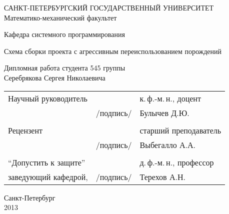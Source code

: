 %
%
\thispagestyle{empty}
\begin{center}
САНКТ-ПЕТЕРБУРГСКИЙ ГОСУДАРСТВЕННЫЙ УНИВЕРСИТЕТ\\
Математико-механический факультет\\
\end{center}

\begin{center}
Кафедра системного программирования\\
\end{center}
\vspace{2cm}
\begin{center}
    \LARGE{Схема сборки проекта с агрессивным переиспользованием порождений} \\
\end{center}
\vspace{1cm}
\begin{center}
    \normalsize{Дипломная работа студента 545 группы} \\
    \large{Серебрякова Сергея Николаевича}
\end{center}
\vspace{3cm}
\noindent
\begin{center}
    \small
    \begin{tabular}{lcl}
        Научный руководитель & \dotuline{\phantom{место для подписи}} & к.\,ф.-м.\,н., доцент\\
        & /подпись/ & Булычев Д.Ю.\\\\
        Рецензент & \dotuline{\phantom{место для подписи}} & старший преподаватель\\
        & /подпись/& Выбегалло А.А.\\\\
        ``Допустить к защите'' & \dotuline{\phantom{место для подписи}} & д.\,ф.-м.\,н., профессор\\
        заведующий кафедрой, & /подпись/& Терехов А.Н.\\
    \end{tabular}
\end{center}
\vspace{\fill}
\begin{center}
    \small
    Санкт-Петербург\\2013
\end{center}
